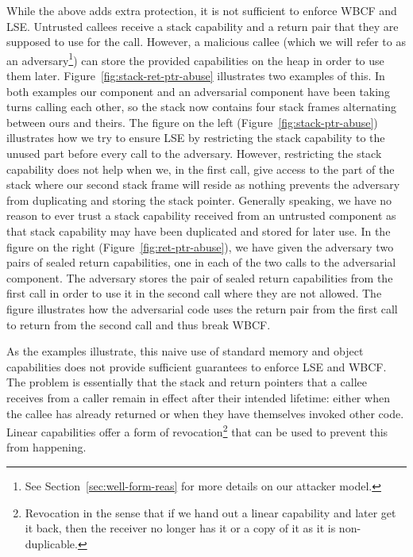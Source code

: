\documentclass[acmsmall,screen]{acmart}\settopmatter{}
\begin{document}
While the above adds extra protection, it is not sufficient to enforce WBCF and LSE.
Untrusted callees receive a stack capability and a return pair that they are supposed to use for the call.
However, a malicious callee (which we will refer to as an adversary\footnote{See Section~\ref{sec:well-form-reas} for more details on our attacker model.}) can store the provided capabilities on the heap in order to use them later.
Figure~\ref{fig:stack-ret-ptr-abuse} illustrates two examples of this.
In both examples our component and an adversarial component have been taking turns calling each other, so the stack now contains four stack frames alternating between ours and theirs.
The figure on the left (Figure~\ref{fig:stack-ptr-abuse}) illustrates how we try to ensure LSE by restricting the stack capability to the unused part before every call to the adversary.
However, restricting the stack capability does not help when we, in the first call, give access to the part of the stack where our second stack frame will reside as nothing prevents the adversary from duplicating and storing the stack pointer.
Generally speaking, we have no reason to ever trust a stack capability received from an untrusted component as that stack capability may have been duplicated and stored for later use.
In the figure on the right (Figure~\ref{fig:ret-ptr-abuse}), we have given the adversary two pairs of sealed return capabilities, one in each of the two calls to the adversarial component.
The adversary stores the pair of sealed return capabilities from the first call in order to use it in the second call where they are not allowed.
The figure illustrates how the adversarial code uses the return pair from the first call to return from the second call and thus break WBCF.

As the examples illustrate, this naive use of standard memory and object capabilities does not provide sufficient guarantees to enforce LSE and WBCF.
The problem is essentially that the stack and return pointers that a callee receives from a caller remain in effect after their intended lifetime: either when the callee has already returned or when they have themselves invoked other code. 
Linear capabilities offer a form of revocation\footnote{Revocation in the sense that if we hand out a linear capability and later get it back, then the receiver no longer has it or a copy of it as it is non-duplicable.} that can be used to prevent this from happening.
\end{document}
